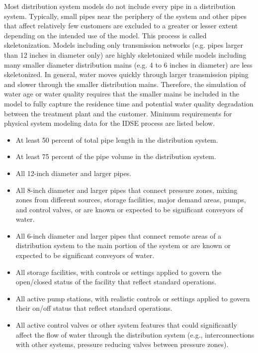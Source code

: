 Most distribution system models do not include every pipe in a distribution system. Typically, small pipes near the periphery of the system and other pipes that affect relatively few customers are excluded to a greater or lesser extent depending on the intended use of the model. This process is called skeletonization. Models including only transmission networks (e.g. pipes larger than 12 inches in diameter only) are highly skeletonized while models including many smaller diameter distribution mains (e.g. 4 to 6 inches in diameter) are less skeletonized. In general, water moves quickly through larger transmission piping and slower through the smaller distribution mains. Therefore, the simulation of water age or water quality requires that the smaller mains be included in the model to fully capture the residence time and potential water quality degradation between the treatment plant and the customer. Minimum requirements for physical system modeling data for the IDSE process are listed below.
\begin{itemize} 
\item At least 50 percent of total pipe length in the distribution system.
\item At least 75 percent of the pipe volume in the distribution system.
\item All 12-inch diameter and larger pipes.
\item All 8-inch diameter and larger pipes that connect pressure zones, mixing zones from different sources, storage facilities, major demand areas, pumps, and control valves, or are known or expected to be significant conveyors of water.
\item All 6-inch diameter and larger pipes that connect remote areas of a distribution system to the main portion of the system or are known or expected to be significant conveyors of water.
\item All storage facilities, with controls or settings applied to govern the open/closed status of the facility that reflect standard operations.
\item All active pump stations, with realistic controls or settings applied to govern their on/off status that reflect standard operations.
\item All active control valves or other system features that could significantly affect the flow of water through the distribution system (e.g., interconnections with other systems, pressure reducing valves between pressure zones).
\end{itemize}


